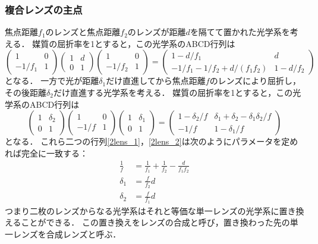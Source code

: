 \documentclass[titlepage]{jsarticle}
\begin{document}
\subsubsection{複合レンズの主点}
焦点距離$f_1$のレンズと焦点距離$f_2$のレンズが距離$d$を隔てて置かれた光学系を考える．
媒質の屈折率を1とすると，この光学系のABCD行列は
\begin{equation}
    \left(
    \begin{array}{cc}
        1 & 0 \\
        -1/f_1 & 1
    \end{array}
    \right)\left(
    \begin{array}{cc}
        1 & d \\
        0 & 1
    \end{array}
    \right)\left(
    \begin{array}{cc}
        1 & 0 \\
        -1/f_2 & 1
    \end{array}
    \right)=\left(
    \begin{array}{cc}
        1-d/f_1 & d \\
        -1/f_1 - 1/f_2 +d/(f_1f_2) & 1 - d/f_2 
    \end{array}
    \right) \label{2lens_1}
\end{equation}
となる．
一方で光が距離$\delta_1$だけ直進してから焦点距離$f$のレンズにより屈折し，その後距離$\delta_2$だけ直進する光学系を考える．
媒質の屈折率を1とすると，この光学系のABCD行列は
\begin{equation}
    \left(
    \begin{array}{cc}
        1 & \delta_2 \\
        0 & 1
    \end{array}
    \right)\left(
    \begin{array}{cc}
        1 & 0 \\
        -1/f & 1
    \end{array}
    \right)\left(
    \begin{array}{cc}
        1 & \delta_1 \\
        0 & 1
    \end{array}
    \right)=\left(
    \begin{array}{cc}
        1-\delta_2/f & \delta_1 + \delta_2 - \delta_1\delta_2/f \\
        -1/f & 1 - \delta_1/f 
    \end{array} \label{2lens_2}
    \right)
\end{equation}
となる．
これら二つの行列\eqref{2lens_1}，\eqref{2lens_2}は次のようにパラメータを定めれば完全に一致する：
\begin{align}
    \frac{1}{f} &= \frac{1}{f_1} + \frac{1}{f_2} - \frac{d}{f_1f_2} \label{df}\\
    \delta_1 &= \frac{f}{f_2}d \label{dd1}\\
    \delta_2 &= \frac{f}{f_1}d \label{dd2}
\end{align}
つまり二枚のレンズからなる光学系はそれと等価な単一レンズの光学系に置き換えることができる．
この置き換えをレンズの合成と呼び，置き換わった先の単一レンズを合成レンズと呼ぶ．
\end{document}
